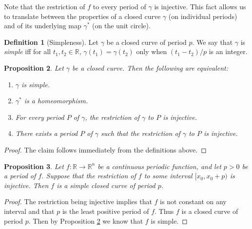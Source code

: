 \documentclass{amsart}
\newtheorem{proposition}{Proposition}[section]
\theoremstyle{definition}
\newtheorem{definition}[proposition]{Definition}
\theoremstyle{remark}
\begin{document}
Note that the restriction of $f$ to every period of $\gamma$ is injective.
This fact allows us to translate between
the properties of a closed curve $\gamma$
(on individual periods) and of its underlying map $\gamma^*$
(on the unit circle).

\begin{definition}[Simpleness]
    \label{def:simpleness}
    Let $\gamma$ be a closed curve of period $p$.
    We say that $\gamma$ is \emph{simple}
    iff for all $t_1,t_2\in\mathbb{R}$, $\gamma(t_1)=\gamma(t_2)$
    only when $(t_1-t_2)/p$ is an integer.
\end{definition}

\begin{proposition}
    \label{pro:simple_equiv}
    Let $\gamma$ be a closed curve.
    Then the following are equivalent:
    \begin{enumerate}
        \item $\gamma$ is simple.
        \item $\gamma^*$ is a homeomorphism.
        \item For every period $P$ of $\gamma$, the restriction
              of $\gamma$ to $P$ is injective.
        \item There exists a period $P$ of $\gamma$ such that
              the restriction of $\gamma$ to $P$ is injective.
    \end{enumerate}
\end{proposition}

\begin{proof}
    The claim follows immediately from the definitions above.
\end{proof}

\begin{proposition}
    \label{pro:simple_suf_cond}
    Let $f:\mathbb{R}\to\mathbb{R}^n$
    be a continuous periodic function,
    and let $p>0$ be a period of $f$. Suppose that
    the restriction of $f$ to some interval $[x_0,x_0+p)$
    is injective.
    Then $f$ is a simple closed curve of period $p$.
\end{proposition}

\begin{proof}
    The restriction being injective implies that
    $f$ is not constant on any interval and that
    $p$ is the least positive period of $f$. Thus $f$ is a 
    closed curve of period $p$. Then by Proposition
    \ref{pro:simple_equiv} we know that $f$ is simple.
\end{proof}
\end{document}
